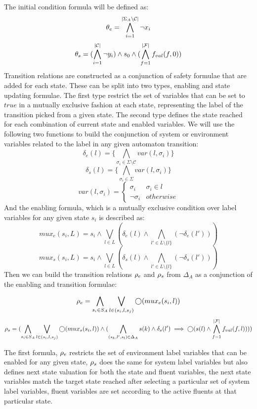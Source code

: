 The initial condition formula will be defined as:
\[{\theta_e} = \bigwedge_{i = 1}^{|\Sigma_A \setminus \mathcal{C}|}\neg x_i\]
\[{\theta_s} = (\bigwedge_{i = 1}^{|\mathcal{C}|}\neg y_i) \wedge s_0 \wedge (\bigwedge_{f = 1}^{|\mathcal{F}|}f_{val}(f,0))\]
Transition relations are constructed as a conjunction of safety formulae that are added for each state. These can be split into two types, enabling and state updating formulae. The first type restrict the set of variables that can be set to $true$ in a mutually exclusive fashion at each state, representing the label of the transition picked from a given state. The second type defines the state reached for each combination of current state and enabled variables. 
We will use the following two functions to build the conjunction of system or environment variables related to the label in any given automaton transition:
\[\delta_e(l) = \{\bigwedge_{\sigma_i \in \Sigma \setminus \mathcal{C}}var(l, \sigma_i)\}\]
\[\delta_s(l) = \{\bigwedge_{\sigma_i \in \Sigma}var(l, \sigma_i)\}\]
\[
var(l, \sigma_i) = \begin{cases}
\sigma_i & \sigma_i \in l \\
\neg \sigma_i & otherwise
\end{cases}
\]
And the enabling formula, which is a mutually exclusive condition over label variables for any given state $s_i$ is described as:
\[mux_e(s_i,L) = s_i \wedge \bigvee_{l \in L}(\delta_e(l) \wedge \bigwedge_{l' \in L \setminus \{l\}}(\neg \delta_e(l')) ) \]
\[mux_s(s_i,L) = s_i \wedge \bigvee_{l \in L}(\delta_s(l) \wedge \bigwedge_{l' \in L \setminus \{l\}}(\neg \delta_s(l')) ) \]
Then we can build the transition relations ${\rho_e}$ and ${\rho_s}$ from $\Delta_A$ as a conjunction of the enabling and transition formulae:

\[ {\rho_e} = \bigwedge_{s_i \in S_A} \bigvee_{l \in (s_i,l,s_j)}\bigcirc(mux_e(s_i,l))\]
\[ {\rho_s} = (\bigwedge_{s_i \in S_A} \bigvee_{l \in (s_i,l,s_j)}\bigcirc(mux_s(s_i,l)) \wedge (\bigwedge_{(s_k,l',s_l) \in \Delta_A} s(k) \wedge \delta_s(l') \implies \bigcirc(s(l) \wedge \bigwedge_{f = 1}^{|\mathcal{F}|}f_{val}(f,l) ) ) ) \]

The first formula, ${\rho_e}$ restricts the set of environment label variables that can be enabled for any given state, ${\rho_s}$ does the same for system label variables but also defines next state valuation for both the state and fluent variables, the next state variables match the target state reached after selecting a particular set of system label variables, fluent variables are set according to the active fluents at that particular state. 
%
%


